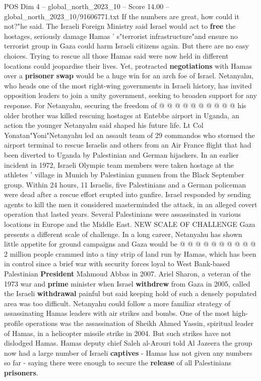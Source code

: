 \begin{textsample}{POS Dim 4 – global\_north\_2023\_10 – Score 14.00 – global\_north\_2023\_10/91606771.txt}
If the numbers are great, how could it not?"he said.
The Israeli Foreign Ministry said Israel would act to \textbf{free} the hostages, seriously damage Hamas ' s"terrorist infrastructure"and ensure no terrorist group in Gaza could harm Israeli citizens again.
But there are no easy choices.
Trying to rescue all those Hamas said were now held in different locations could jeopardise their lives.
Yet, protracted \textbf{negotiations} with Hamas over a \textbf{prisoner} \textbf{swap} would be a huge win for an arch foe of Israel.
Netanyahu, who heads one of the most right-wing governments in Israeli history, has invited opposition leaders to join a unity government, seeking to broaden support for any response.
For Netanyahu, securing the freedom of @ @ @ @ @ @ @ @ @ @ his older brother was killed rescuing hostages at Entebbe airport in Uganda, an action the younger Netanyahu said shaped his future life.
Lt Col Yonatan"Yoni"Netanyahu led an assault team of 29 commandos who stormed the airport terminal to rescue Israelis and others from an Air France flight that had been diverted to Uganda by Palestinian and German hijackers.
In an earlier incident in 1972, Israeli Olympic team members were taken hostage at the athletes ' village in Munich by Palestinian gunmen from the Black September group.
Within 24 hours, 11 Israelis, five Palestinians and a German policeman were dead after a rescue effort erupted into gunfire.
Israel responded by sending agents to kill the men it considered masterminded the attack, in an alleged covert operation that lasted years.
Several Palestinians were assassinated in various locations in Europe and the Middle East.
NEW SCALE OF CHALLENGE Gaza presents a different scale of challenge.
In a long career, Netanyahu has shown little appetite for ground campaigns and Gaza would be @ @ @ @ @ @ @ @ @ @ 2 million people crammed into a tiny strip of land run by Hamas, which has been in control since a brief war with security forces loyal to West Bank-based Palestinian \textbf{President} Mahmoud Abbas in 2007.
Ariel Sharon, a veteran of the 1973 war and \textbf{prime} minister when Israel \textbf{withdrew} from Gaza in 2005, called the Israeli \textbf{withdrawal} painful but said keeping hold of such a densely populated area was too difficult.
Netanyahu could follow a more familiar strategy of assassinating Hamas leaders with air strikes and bombs.
One of the most high-profile operations was the assassination of Sheikh Ahmed Yassin, spiritual leader of Hamas, in a helicopter missile strike in 2004.
But such strikes have not dislodged Hamas.
Hamas deputy chief Saleh al-Arouri told Al Jazeera the group now had a large number of Israeli \textbf{captives} - Hamas has not given any numbers so far - saying there were enough to secure the \textbf{release} of all Palestinians \textbf{prisoners}.

\end{textsample}
